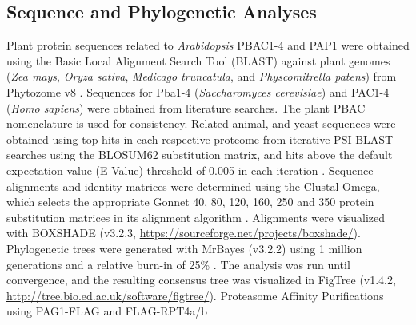 \subsection{Sequence and Phylogenetic Analyses}
Plant protein sequences related to \textit{Arabidopsis} PBAC1-4 and PAP1 were obtained using the Basic Local Alignment Search Tool (BLAST) against plant genomes (\textit{Zea mays}, \textit{Oryza sativa}, \textit{Medicago truncatula}, and \textit{Physcomitrella patens}) from Phytozome v8 \citep{goodstein12}. Sequences for Pba1-4 (\textit{Saccharomyces cerevisiae}) and PAC1-4 (\textit{Homo sapiens}) were obtained from literature searches. The plant PBAC nomenclature is used for consistency. Related animal, and yeast sequences were obtained using top hits in each respective proteome from iterative PSI-BLAST searches using the BLOSUM62 substitution matrix, and hits above the default expectation value (E-Value) threshold of 0.005 in each iteration \citep{altschul97}. Sequence alignments and identity matrices were determined using the Clustal Omega, which selects the appropriate Gonnet 40, 80, 120, 160, 250 and 350 protein substitution matrices in its alignment algorithm \citep{gonnet92, sievers14, sievers11}. Alignments were visualized with BOXSHADE (v3.2.3, \url{https://sourceforge.net/projects/boxshade/}). Phylogenetic trees were generated with MrBayes (v3.2.2) using 1 million generations and a relative burn-in of 25\% \citep{ronquist12}. The analysis was run until convergence, and the resulting consensus tree was visualized in FigTree (v1.4.2, \url{http://tree.bio.ed.ac.uk/software/figtree/}). 
Proteasome Affinity Purifications using PAG1-FLAG and FLAG-RPT4a/b

